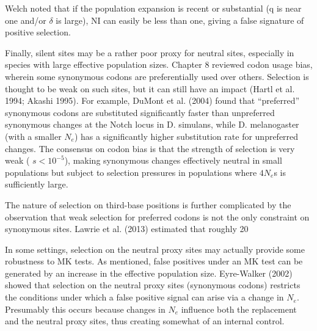 \documentclass{article}
\begin{document}
Welch noted that if the population expansion is recent or substantial (q is near one and/or  $ \delta $ is large), NI can easily be less than one, giving a false signature of positive selection.

Finally, silent sites may be a rather poor proxy for neutral sites, especially in species with large effective population sizes. Chapter 8 reviewed codon usage bias, wherein some synonymous codons are preferentially used over others. Selection is thought to be weak on such sites, but it can still have an impact (Hartl et al. 1994; Akashi 1995). For example, DuMont et al. (2004) found that “preferred” synonymous codons are substituted significantly faster than unpreferred synonymous changes at the Notch locus in D. simulans, while D. melanogaster (with a smaller  $ N_e $) has a significantly higher substitution rate for unpreferred changes. The consensus on codon bias is that the strength of selection is very weak ( $ s < 10^{-5} $), making synonymous changes effectively neutral in small populations but subject to selection pressures in populations where  $ 4N_e $s is sufficiently large.

The nature of selection on third-base positions is further complicated by the observation that weak selection for preferred codons is not the only constraint on synonymous sites. Lawrie et al. (2013) estimated that roughly 20%

In some settings, selection on the neutral proxy sites may actually provide some robustness to MK tests. As mentioned, false positives under an MK test can be generated by an increase in the effective population size. Eyre-Walker (2002) showed that selection on the neutral proxy sites (synonymous codons) restricts the conditions under which a false positive signal can arise via a change in  $ N_{e} $. Presumably this occurs because changes in  $ N_{e} $ influence both the replacement and the neutral proxy sites, thus creating somewhat of an internal control.
\end{document}
